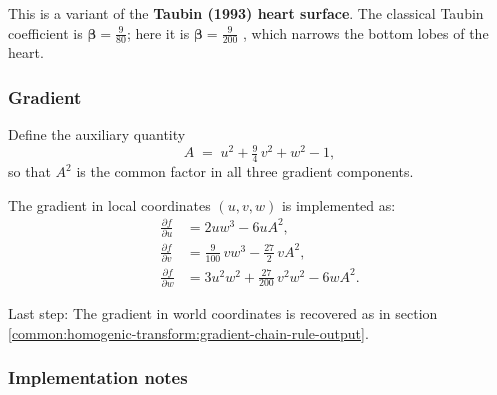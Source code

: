 \documentclass{article}
\begin{document}




This is a variant of the \textbf{Taubin (1993) heart surface}.
The classical Taubin coefficient is $\bm\beta=\tfrac{9}{80}$;
here it is $\bm\beta=\tfrac{9}{200}$ \cite{m.karotsieris:9af5c56},
which narrows the bottom lobes of the heart.

\subsubsection{Gradient}

Define the auxiliary quantity
\begin{equation}
  A \;=\; u^2 + \tfrac{9}{4}\,v^2 + w^2 - 1 ,
\end{equation}
so that $A^2$ is the common factor in all three gradient components.

The gradient in local coordinates $(u,v,w)$ is implemented as:
\begin{align}
  \frac{\partial f}{\partial u}
    &= 2u w^3 - 6u A^2 ,
  \\[4pt]
  \frac{\partial f}{\partial v}
    &= \frac{9}{100}\,v w^3 - \frac{27}{2}\,v A^2 ,
  \\[4pt]
  \frac{\partial f}{\partial w}
    &= 3 u^2 w^2 + \frac{27}{200}\,v^2 w^2 - 6 w A^2 .
\end{align}

\noindent
Last step:
The gradient in world coordinates is recovered as in section \ref{common:homogenic-transform:gradient-chain-rule-output}.

\subsubsection{Implementation notes}
\end{document}
